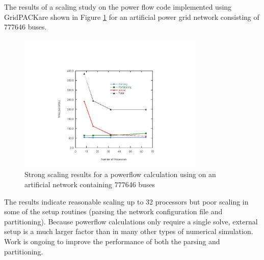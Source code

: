 \documentclass[preprint]{acm_proc_article-sp}
\begin{document}
The results of a scaling study on the power flow code implemented using
GridPACK\texttrademark are shown in Figure \ref{powerflow} for an
artificial power grid network consisting of 777646 buses.
\begin{figure}
\centering
\includegraphics[width=3.5in,keepaspectratio=true]{./FigPF}
\caption{\label{powerflow} Strong scaling results for a powerflow calculation
using on an artificial network containing 777646 buses }
\end{figure}
The results indicate reasonable scaling up to 32 processors but poor scaling in
some of the setup routines (parsing the network configuration file and
partitioning). Because powerflow calculations only require a single solve,
external setup is a much larger factor than in many other types of numerical
simulation. Work is ongoing to improve the performance of both the parsing and
partitioning.
\end{document}
